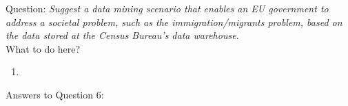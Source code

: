 Question:
\emph{
    Suggest a data mining scenario that enables an EU government to address a societal
problem, such as the immigration/migrants problem, based on the data stored at the
Census Bureau’s data warehouse.
}\\

What to do here?
\begin{enumerate}
    \item 
  \end{enumerate}

Answers to Question 6:

